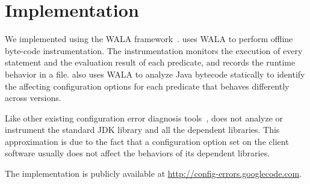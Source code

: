 \section{Implementation}
\label{sec:implementation}

We implemented \ourtool using the WALA
framework~\cite{wala}. \ourtool uses WALA to perform offline
byte-code instrumentation. The instrumentation
monitors the execution of every statement and the evaluation
result of each predicate, and records the runtime behavior
in a file. \ourtool also uses WALA
to analyze Java bytecode statically to
identify the affecting configuration options
for each predicate that behaves differently across versions.

Like other existing configuration error
diagnosis tools~\cite{Rabkin:2011:PPC, Zhang:2013:ADS}, \ourtool does not 
analyze or instrument the standard JDK library and
all the dependent libraries. This approximation
is due to the fact that a configuration
option set on the client software usually
does not affect the behaviors of its dependent libraries.

The \ourtool implementation is publicly available at
\url{http://config-errors.googlecode.com}.
